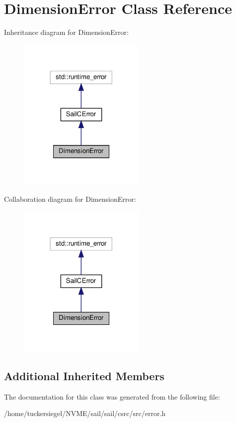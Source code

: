 \hypertarget{classDimensionError}{}\section{Dimension\+Error Class Reference}
\label{classDimensionError}


Inheritance diagram for Dimension\+Error\+:\nopagebreak
\begin{figure}[H]
\begin{center}
\leavevmode
\includegraphics[width=173pt]{classDimensionError__inherit__graph}
\end{center}
\end{figure}


Collaboration diagram for Dimension\+Error\+:\nopagebreak
\begin{figure}[H]
\begin{center}
\leavevmode
\includegraphics[width=173pt]{classDimensionError__coll__graph}
\end{center}
\end{figure}
\subsection*{Additional Inherited Members}


The documentation for this class was generated from the following file\+:\begin{DoxyCompactItemize}
\item 
/home/tuckersiegel/\+N\+V\+M\+E/sail/sail/csrc/src/error.\+h\end{DoxyCompactItemize}
